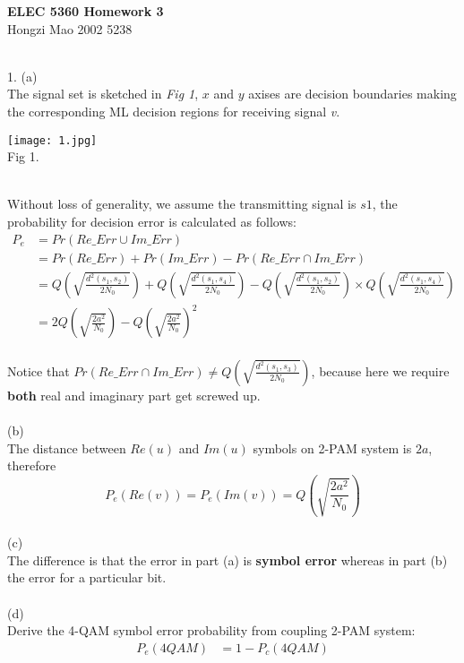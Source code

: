 \documentclass [12pt] {article}
\begin{document}
\begin{spacing}{1.5}
\begin{center}
\small
\textbf{ELEC 5360 Homework 3}\\ Hongzi Mao 2002 5238\\
\end{center}
\normalsize
~\\
1. (a)\\
The signal set is sketched in \emph{Fig 1}, $x$ and $y$ axises are decision boundaries making the corresponding ML decision regions for receiving signal \emph{v}.\\
\begin{center}
\texttt{[image: 1.jpg]}\\
\small
Fig 1. \\
\end{center}
~\\
\normalsize
Without loss of generality, we assume the transmitting signal is $s1$, the probability for decision error is calculated as follows:
\begin{align*}
P_e&= Pr(Re\_Err \cup Im\_Err)\\
&= Pr(Re\_Err) + Pr(Im\_Err) - Pr(Re\_Err \cap Im\_Err)\\
&= Q(\sqrt{\frac{d^2(s_1,s_2)}{2N_0}}) + Q(\sqrt{\frac{d^2(s_1,s_4)}{2N_0}}) - Q(\sqrt{\frac{d^2(s_1,s_2)}{2N_0}})\times Q(\sqrt{\frac{d^2(s_1,s_4)}{2N_0}}) \\
&= 2 Q(\sqrt{\frac{2 a^2}{N_0}}) - Q(\sqrt{\frac{2 a^2}{N_0}})^2
\end{align*}\\
Notice that $Pr(Re\_Err \cap Im\_Err) \neq Q(\sqrt{\frac{d^2(s_1,s_3)}{2N_0}}) $, because here we require \textbf{both} real and imaginary part get screwed up.\\
~\\
(b)\\
The distance between $Re(u)$ and $Im(u)$ symbols on 2-PAM system is $2a$, therefore
$$P_e(Re(v)) = P_e(Im(v))  =Q(\sqrt{\frac{2 a^2}{N_0}}) $$
~\\
(c)\\
The difference is that the error in part (a) is \textbf{symbol error} whereas in part (b) the error for a particular bit.\\
~\\
(d)\\
Derive the 4-QAM symbol error probability from coupling 2-PAM system:
\begin{align*}
P_e(4QAM) &= 1 - P_c(4QAM)\\

\end{align*}
\end{spacing}
\end{document}
